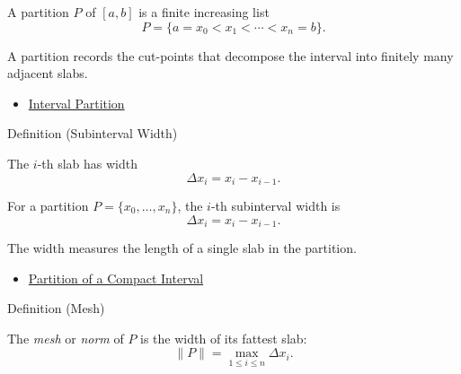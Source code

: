 \begin{remark*}
A partition \(P\) of \([a,b]\) is a finite increasing list
\[
  P=\{a=x_0<x_1<\cdots<x_n=b\}.
\]
\end{remark*}

\begin{remark*}[Interpretation]
A partition records the cut-points that decompose the interval into finitely
many adjacent slabs.
\end{remark*}

\begin{dependencies}
\begin{itemize}
  \item \hyperref[def:interval-partition]{Interval Partition}
\end{itemize}
\end{dependencies}

\begin{definitionbox}{Definition (Subinterval Width)}
\begin{definition}
\label{def:subinterval-width-integration}
The \(i\)-th slab has width
\[
  \Delta x_i=x_i-x_{i-1}.
\]
\end{definition}
\end{definitionbox}

\begin{remark*}
For a partition \(P=\{x_0,\ldots,x_n\}\), the \(i\)-th subinterval width is
\[
  \Delta x_i=x_i-x_{i-1}.
\]
\end{remark*}

\begin{remark*}[Interpretation]
The width measures the length of a single slab in the partition.
\end{remark*}

\begin{dependencies}
\begin{itemize}
  \item \hyperref[def:integration-partition]{Partition of a Compact Interval}
\end{itemize}
\end{dependencies}

\begin{definitionbox}{Definition (Mesh)}
\begin{definition}
\label{def:partition-mesh}
The \emph{mesh} or \emph{norm} of \(P\) is the width of its fattest slab:
\[
  \|P\|=\max_{1\le i\le n}\Delta x_i.
\]
\end{definition}
\end{definitionbox}

